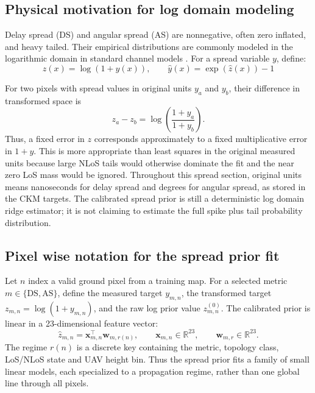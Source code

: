 \subsection{Physical motivation for log domain modeling}

Delay spread (DS) and angular spread (AS) are nonnegative, often
zero inflated, and heavy tailed. Their empirical distributions are commonly
modeled in the logarithmic domain in standard channel models
\cite{tr38901,winner2}. For a spread variable $y$, define:
\begin{equation}
z(x) = \log(1 + y(x)),\qquad \hat y(x) = \exp(\hat z(x)) - 1
\label{eq:log_transform_spread}
\end{equation}

For two pixels with spread values in original units \(y_a\) and \(y_b\), their difference
in transformed space is
\begin{equation}
z_a-z_b
=
\log\!\left(\frac{1+y_a}{1+y_b}\right).
\label{eq:log_ratio_spread}
\end{equation}
Thus, a fixed error in \(z\) corresponds approximately to a fixed
multiplicative error in \(1+y\). This is more appropriate than least squares in
the original measured units because large NLoS tails would otherwise dominate
the fit and the near zero LoS mass would be ignored. Throughout this spread
section, original units means nanoseconds for delay spread and degrees for
angular spread, as stored in the CKM targets. The calibrated spread prior is
still a deterministic log domain ridge estimator; it is not claiming to
estimate the full spike plus tail probability distribution.

\subsection{Pixel wise notation for the spread prior fit}

Let \(n\) index a valid ground pixel from a training map. For a selected
metric \(m \in \{\mathrm{DS},\mathrm{AS}\}\), define the measured target
\(y_{m,n}\), the transformed target \(z_{m,n}=\log(1+y_{m,n})\), and the
raw log prior value \(z^{(0)}_{m,n}\). The calibrated prior is linear in a
23-dimensional feature vector:
\begin{equation}
\hat z_{m,n}
=
\textbf{x}_{m,n}^{\top}\textbf{w}_{m,r(n)},
\qquad
\textbf{x}_{m,n}\in\mathbb{R}^{23},
\qquad
\textbf{w}_{m,r}\in\mathbb{R}^{23}.
\label{eq:spread_pixel_linear}
\end{equation}
The regime \(r(n)\) is a discrete key containing the metric, topology class,
LoS/NLoS state and UAV height bin. Thus the spread prior fits a family of
small linear models, each specialized to a propagation regime, rather than one
global line through all pixels.

